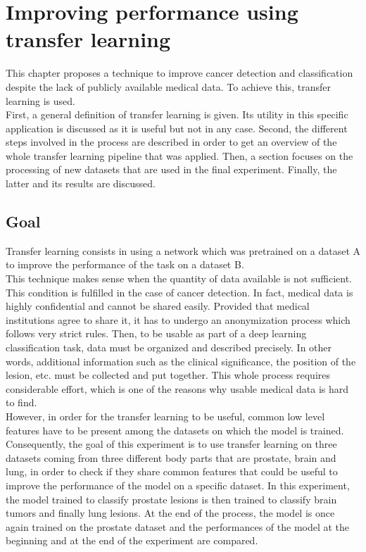 
\chapter{Improving performance using transfer learning}
\label{ch:transfer_learning}
\setlength{\marginparwidth}{3cm}\leavevmode {}This chapter proposes a technique to improve cancer detection and classification despite the lack of publicly available medical data. To achieve this, transfer learning is used.\\
First, a general definition of transfer learning is given. Its utility in this specific application is discussed as it is useful but not in any case. Second, the different steps involved in the process are described in order to get an overview of the whole transfer learning pipeline that was applied. Then, a section focuses on the processing of new datasets that are used in the final experiment. Finally, the latter and its results are discussed. 


\section{Goal}
\setlength{\marginparwidth}{3cm}\leavevmode {}Transfer learning consists in using a network which was pretrained on a dataset A to improve the performance of the task on a dataset B.\\
This technique makes sense when the quantity of data available is not sufficient. This condition is fulfilled in the case of cancer detection. In fact, medical data is highly confidential and cannot be shared easily. Provided that medical institutions agree to share it, it has to undergo an anonymization process which follows very strict rules. Then, to be usable as part of a deep learning classification task, data must be organized and described precisely. In other words, additional information such as the clinical significance, the position of the lesion, etc. must be collected and put together. This whole process requires considerable effort, which is one of the reasons why usable medical data is hard to find.\\
However, in order for the transfer learning to be useful, common low level features have to be present among the datasets on which the model is trained. Consequently, the goal of this experiment is to use transfer learning on three datasets coming from three different body parts that are prostate, brain and lung, in order to check if they share common features that could be useful to improve the performance of the model on a specific dataset. In this experiment, the model trained to classify prostate lesions is then trained to classify brain tumors and finally lung lesions. At the end of the process, the model is once again trained on the prostate dataset and the performances of the model at the beginning and at the end of the experiment are compared.


